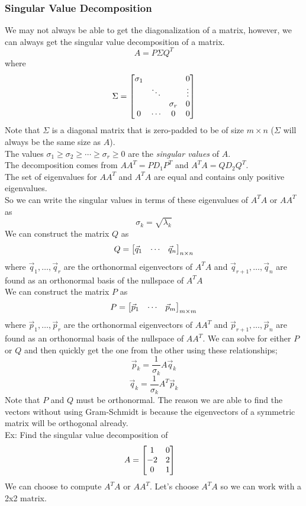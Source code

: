 \documentclass[11pt, fleqn]{article}
\begin{document}
\subsubsection{Singular Value Decomposition}
We may not always be able to get the diagonalization of a matrix, however, we can always get the singular value decomposition of a matrix.
$$A=P\Sigma Q^T$$
where
$$\Sigma=\matrixx{\sigma_1 & & & 0\\ & \ddots & & \vdots\\ & & \sigma_r & 0\\ 0 & \cdots & 0 & 0}$$
Note that $\Sigma$ is a diagonal matrix that is zero-padded to be of size $m\times n$ ($\Sigma$ will always be the same size as $A$).\\
The values $\sigma_1\geq \sigma_2\geq\cdots\geq \sigma_r\geq 0$ are the \textit{singular values} of $A$.\\
The decomposition comes from $AA^T=PD_1P^T$ and $A^TA=QD_2Q^T$.\\
The set  of eigenvalues for $AA^T$ and $A^TA$ are equal and contains only positive eigenvalues.\\
So we can write the singular values in terms of these eigenvalues of $A^TA$ or $AA^T$ as
$$\sigma_k=\sqrt{\lambda_k}$$
We can construct the matrix $Q$ as
$$Q=\matrixx{\vec{q}_1 & \cdots & \vec{q}_n}_{n\times n}$$
where $\vec{q}_1,\ldots,\vec{q}_r$ are the orthonormal eigenvectors of $A^TA$ and $\vec{q}_{r+1},\ldots,\vec{q}_n$ are found as an orthonormal basis of the nullspace of $A^TA$\\
We can construct the matrix $P$ as
$$P=\matrixx{\vec{p}_1 & \cdots & \vec{p}_m}_{m\times m}$$
where $\vec{p}_1,\ldots,\vec{p}_r$ are the orthonormal eigenvectors of $AA^T$ and $\vec{p}_{r+1},\ldots,\vec{p}_n$ are found as an orthonormal basis of the nullspace of $AA^T$.
We can solve for either $P$ or $Q$ and then quickly get the one from the other using these relationships;
$$\vec{p}_k=\frac{1}{\sigma_k}A\vec{q}_k$$
$$\vec{q}_k=\frac{1}{\sigma_k}A^T\vec{p}_k$$
Note that $P$ and $Q$ must be orthonormal. The reason we are able to find the vectors without using Gram-Schmidt is because the eigenvectors of a symmetric matrix will be orthogonal already.\\
Ex: Find the singular value decomposition of
\begin{align*}
    &A=\matrixx{1 & 0\\ -2 & 2\\ 0 & 1}
\end{align*}
We can choose to compute $A^TA$ or $AA^T$. Let's choose $A^TA$ so we can work with a 2x2 matrix.
\end{document}
